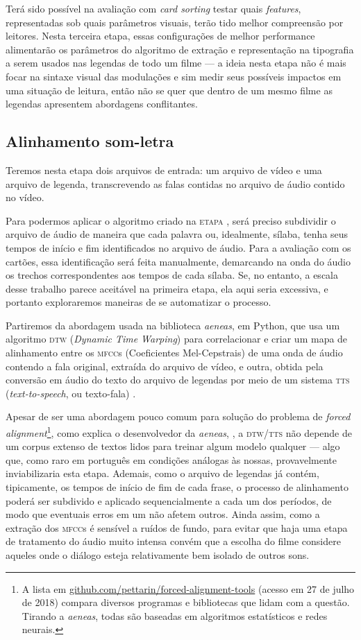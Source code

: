 \documentclass[a4paper,11pt,titlepage,singlespacing]{article}
\newcommand{\etapa}[1]{\textsc{etapa \oldstylenums{#1}}}
\begin{document}
Terá sido possível na avaliação com \textit{card sorting} testar quais \textit{features}, representadas sob quais parâmetros visuais, terão tido melhor compreensão por leitores. Nesta terceira etapa, essas configurações de melhor performance alimentarão os parâmetros do algoritmo de extração e representação na tipografia a serem usados nas legendas de todo um filme — a ideia nesta etapa não é mais focar na sintaxe visual das modulações e sim medir seus possíveis impactos em uma situação de leitura, então não se quer que dentro de um mesmo filme as legendas apresentem abordagens conflitantes.

\subsection*{Alinhamento som-letra}

Teremos nesta etapa dois arquivos de entrada: um arquivo de vídeo e uma arquivo de legenda, transcrevendo as falas contidas no arquivo de áudio contido no vídeo. 

Para podermos aplicar o algoritmo criado na \etapa{1}, será preciso subdividir o arquivo de áudio de maneira que cada palavra ou, idealmente, sílaba, tenha seus tempos de início e fim identificados no arquivo de áudio. Para a avaliação com os cartões, essa identificação será feita manualmente, demarcando na onda do áudio os trechos correspondentes aos tempos de cada sílaba. Se, no entanto, a escala desse trabalho parece aceitável na primeira etapa, ela aqui seria excessiva, e portanto exploraremos maneiras de se automatizar o processo.

Partiremos da abordagem usada na biblioteca \textit{aeneas}, em Python, que usa um algoritmo \textsc{dtw} (\textit{Dynamic Time Warping}) para correlacionar e criar um mapa de alinhamento entre os \textsc{mfcc}s (Coeficientes Mel-Cepstrais) de uma onda de áudio contendo a fala original, extraída do arquivo de vídeo, e outra, obtida pela conversão em áudio do texto do arquivo de legendas por meio de um sistema \textsc{tts} (\textit{text-to-speech}, ou texto-fala) \cite{aeneas}. 

Apesar de ser uma abordagem pouco comum para solução do problema de \textit{forced alignment}\footnote{A lista em \url{github.com/pettarin/forced-alignment-tools} (acesso em 27 de julho de 2018) compara diversos programas e bibliotecas que lidam com a questão. Tirando a \textit{aeneas}, todas são baseadas em algoritmos estatísticos e redes neurais.}, como explica o desenvolvedor da \textit{aeneas}, , a \textsc{dtw/tts} não depende de um corpus extenso de textos lidos para treinar algum modelo qualquer — algo que, como raro em português em condições análogas às nossas, provavelmente inviabilizaria esta etapa. Ademais, como o arquivo de legendas já contém, tipicamente, os tempos de início de fim de cada frase, o processo de alinhamento poderá ser subdivido e aplicado sequencialmente a cada um dos períodos, de modo que eventuais erros em um não afetem outros. Ainda assim, como a extração dos \textsc{mfcc}s é sensível a ruídos de fundo, para evitar que haja uma etapa de tratamento do áudio muito intensa convém que a escolha do filme considere aqueles onde o diálogo esteja relativamente bem isolado de outros sons.
\end{document}
